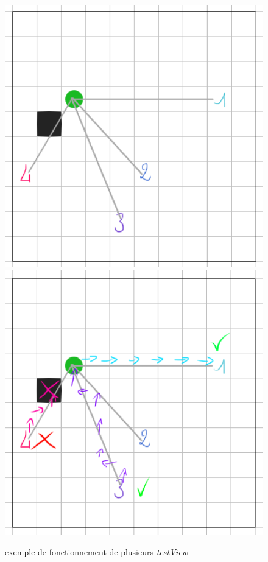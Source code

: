 \documentclass[a4paper,12pt]{article} %
\begin{document}
\begin{figure}[!h]
\centering
\includegraphics[scale=0.2]{images/ex1.png}
\includegraphics[scale=0.2]{images/ex2.png}
\caption{exemple de fonctionnement de plusieurs \textit{testView}}

\end{figure}
\end{document}
